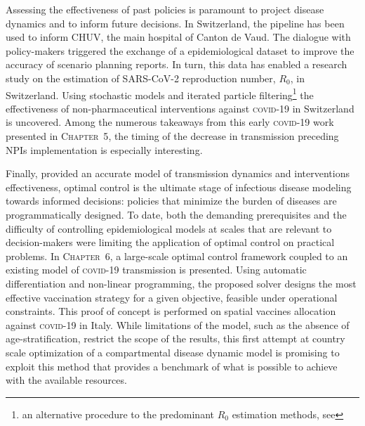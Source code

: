 Assessing the effectiveness of past policies is paramount to project disease dynamics and to inform future decisions. In Switzerland, the pipeline has been used to inform CHUV, the main hospital of Canton de Vaud. The dialogue with policy-makers triggered the exchange of a epidemiological dataset to improve the accuracy of scenario planning reports. In turn, this data has enabled a research study on the estimation of SARS-CoV-2 reproduction number, $R_0$, in Switzerland. Using stochastic models and iterated particle filtering\footnote{an alternative procedure to the predominant $R_0$ estimation methods, see } the effectiveness of non-pharmaceutical interventions against \textsc{covid-19} in Switzerland is uncovered. Among the numerous takeaways from this early \textsc{covid}-19 work presented in \textsc{Chapter~5}, the timing of the decrease in transmission preceding NPIs implementation is especially interesting. %

Finally, provided an accurate model of transmission dynamics and interventions effectiveness, optimal control is the ultimate stage of infectious disease modeling towards informed decisions: policies that minimize the burden of diseases are programmatically designed. To date, both the demanding prerequisites and the difficulty of controlling epidemiological models at scales that are relevant to decision-makers were limiting the application of optimal control on practical problems. In \textsc{Chapter~6}, a large-scale optimal control framework coupled to an existing model of \textsc{covid}-19 transmission\cite{Gatto:SpreadDynamicsCOVID19:2020,Bertuzzo:GeographyCOVID19Spread:2020} is presented.  Using automatic differentiation and non-linear programming, the proposed solver designs the most effective vaccination strategy for a given objective, feasible under operational constraints. This proof of concept is performed on spatial vaccines allocation against \textsc{covid}-19 in Italy. While limitations of the model, such as the absence of age-stratification, restrict the scope of the results, this first attempt at country scale optimization of a compartmental disease dynamic model is promising to exploit this method that provides a benchmark of what is possible to achieve with the available resources.%


